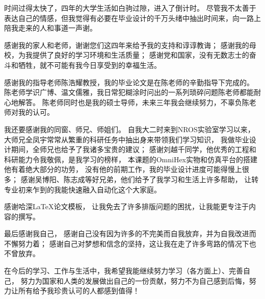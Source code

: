 
\begin{acknowledgements}
时间过得太快了，四年的大学生活如白驹过隙，进入了倒计时。
尽管我不太善于表达自己的情感，但我觉得有必要在毕业设计的千万头绪中抽出时间来，向一路上陪我走来的人和事道一声谢。

感谢我的家人和老师，谢谢您们这四年来给予我的支持和谆谆教诲；
感谢我的母校，为我提供了良好的学习环境和生活质量；
感谢党和国家，没有无数志士的奋斗和牺牲，就不可能有我今日享受到的幸福生活。

感谢我的指导老师陈浩耀教授，我的毕业论文是在陈老师的辛勤指导下完成的。
陈老师学识广博、温文儒雅，我日常犯糊涂时问出的一系列琐碎问题陈老师都能耐心地解答。
陈老师同时也是我的硕士导师，未来三年我会继续努力，不辜负陈老师对我的认可。

我还要感谢我的同窗、师兄、师姐们。
自我大二时来到NROS实验室学习以来，大师兄全凤宇常常从繁重的科研任务中抽出身来带领我们学习知识，
我做毕业设计期间，全师兄也给予了我诸多宝贵的建议；
感谢刘越千同学，他优秀的工程和科研能力令我敬佩，是我学习的榜样，
本课题的OmniHex实物和仿真平台的搭建他有着绝大部分的功劳，
没有他的前期工作，我的毕业设计进度可能得慢上很多；
感谢吴博阳、陈志成等好兄弟，他们给予了我学习和生活上许多帮助，
让转专业初来乍到的我能快速融入自动化这个大家庭。

感谢哈深\LaTeX{}论文模板\hitszthesis，
让我免去了许多排版问题的困扰，让我能更专注于内容的撰写。

最后感谢我自己，
感谢自己没有因为许多的不完美而自我放弃，并为自我改进而不懈努力着；
感谢自己对梦想和信念的坚持，这让我在走了许多弯路的情况下也不曾放弃。

在今后的学习、工作与生活中，我希望我能继续努力学习（各方面上）、完善自己，
努力为国家和人类的发展做出自己的一份贡献，努力不为自己感到后悔，努力让所有给予我珍贵认可的人都感到值得！

\end{acknowledgements}
